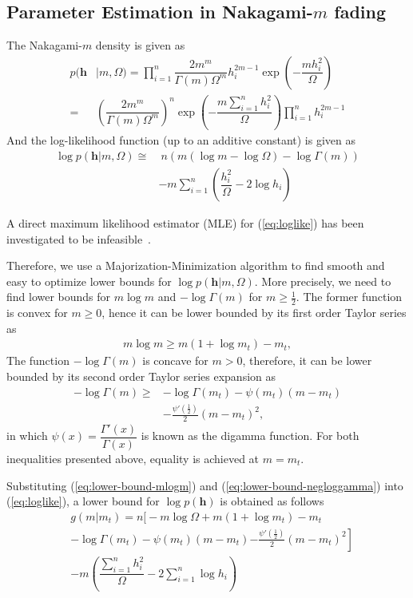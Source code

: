 \documentclass[conference, 10pt]{IEEEtran}
\begin{document}
\subsection{Parameter Estimation in Nakagami-$m$ fading}
The Nakagami-$m$ density is given as
\begin{align}
    p(\bm{h} &| m, \Omega) = \prod_{i=1}^{n}\dfrac{2m^m}{\Gamma(m)\Omega^{m}}h_i^{2m - 1}
              \exp\left(-\dfrac{mh_i^2}{\Omega}\right) \nonumber \\
          = & \left(\dfrac{2m^m}{\Gamma(m)\Omega^{m}}\right)^{n}
          \exp\left(-\dfrac{m\sum_{i=1}^{n}h_i^2}{\Omega}\right) \prod_{i=1}^{n}h_i^{2m - 1}
\end{align}
And the log-likelihood function (up to an additive constant) is given as
\begin{align}
\log p(\bm{h} | m, \Omega) \cong &~n\left(m\left(\log m - \log\Omega\right) - \log\Gamma(m)\right)\nonumber
    \\ & -m\sum_{i=1}^{n}\left(\dfrac{h_i^2}{\Omega} - 2\log h_i\right)
    \label{eq:loglike}
\end{align}

A direct maximum likelihood estimator (MLE) for (\ref{eq:loglike}) has been
investigated to be infeasible~\cite{cheng2001}.

Therefore, we use a Majorization-Minimization algorithm to find smooth
and easy to optimize lower bounds for $\log p(\bm{h}| m, \Omega)$. More precisely,
we need to find lower bounds for $m\log m$ and $-\log \Gamma(m)$ for $m \geq \frac{1}{2}$.
The former function is convex for $m \geq 0$, hence it can be lower bounded
by its first order Taylor series as
\begin{align}
    m \log m \geq m(1 + \log m_t) - m_t,
    \label{eq:lower-bound-mlogm}
\end{align}
The function $-\log \Gamma(m)$ is concave for $m > 0$, therefore, it can be lower bounded
by its second order Taylor series expansion as
\begin{align}
    -\log \Gamma(m) \geq& - \log \Gamma(m_t) - \psi(m_t) (m - m_t)\nonumber\\
                        & - \frac{\psi'\left(\frac{1}{2}\right)}{2}(m - m_t) ^ 2,
    \label{eq:lower-bound-negloggamma}
\end{align}
in which $\psi(x) = \dfrac{\Gamma'(x)}{\Gamma(x)}$ is known as the digamma function.
For both inequalities presented above, equality is achieved at $m = m_t$.

Substituting (\ref{eq:lower-bound-mlogm}) and (\ref{eq:lower-bound-negloggamma}) into
(\ref{eq:loglike}), a lower bound for $\log p(\bm{h})$ is obtained as follows
\begin{align}
    &g(m | m_t) = n\left.\Bigg[-m\log\Omega  + m(1 + \log m_t) - m_t\right.\nonumber\\
    & -\log \Gamma(m_t) - \psi(m_t) (m - m_t) \left. - \frac{\psi'\left(\frac{1}{2}\right)}{2}(m - m_t)^2\right]\nonumber\\
    & -m\left(\dfrac{\sum_{i=1}^{n}h_i^2}{\Omega} - 2\sum_{i=1}^{n}\log h_i\right)
    \label{eq:surrogate}
\end{align}
\end{document}
